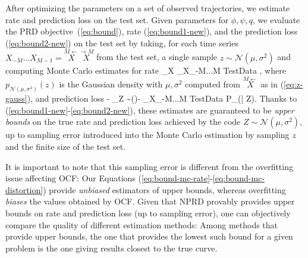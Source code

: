\documentclass[entropy,article,submit,moreauthors,pdftex,10pt,a4paper]{Definitions/mdpi}
\newcommand{\finitefuture}{\stackrel{\rightarrow \scriptscriptstyle{M}}{X}}
\newcommand{\finitepast}{\stackrel{\scriptscriptstyle{M}\leftarrow}{X}}%
\let\oldequation\equation
\let\oldendequation\endequation
\renewenvironment{equation}
  {\linenomathNonumbers\oldequation}
  {\oldendequation\endlinenomath}
\begin{document}
After optimizing the parameters on a set of observed trajectories, we estimate rate and prediction loss on the test set.
Given parameters for $\phi, \psi, q$, we evaluate the PRD objective~(\ref{eq:bound}), rate (\ref{eq:bound1-new}), and the prediction loss (\ref{eq:bound2-new}) on the test set by taking, for each time series $X_{-M}...X_{M-1} = \finitepast\finitefuture$ from the test set, a single sample $z  \sim \mathcal{N}(\mu, \sigma^2)$ and computing Monte Carlo estimates for rate
\begin{equation}\label{eq:bound-mc-rate}
_{X}\left[ \operatorname{D_{KL}}\infdivx{P_\phi(Z|\finitepast)}{q(Z)}\right] \approx	{}	\sum_{X_{-M...M} \in TestData}  \log {},
\end{equation}
where $p_{\mathcal{N}(\mu, \sigma^2)}(z)$ is the Gaussian density with $\mu, \sigma^2$ computed from $\finitepast$ as in (\ref{eq:z-gauss}), and prediction loss 
\begin{equation}\label{eq:bound-mc-distortion}
 -	_{Z \sim \phi(\finitepast)}\left[\log P_\psi(\finitefuture | Z)\right] \approx - 	\sum_{X_{-M...M} \in TestData}	\log P_\psi(\finitefuture | Z).
\end{equation}
Thanks to (\ref{eq:bound1-new}-\ref{eq:bound2-new}), these estimates are guaranteed to be \emph{upper bounds} on the true rate and prediction loss achieved by the code $Z  \sim \mathcal{N}(\mu, \sigma^2)$, up to sampling error introduced into the Monte Carlo estimation by sampling $z$ and the finite size of the test set.



It is important to note that this sampling error is different from the overfitting issue affecting OCF: 
Our Equations (\ref{eq:bound-mc-rate}-\ref{eq:bound-mc-distortion}) provide \emph{unbiased} estimators of upper bounds, whereas overfitting \emph{biases} the values obtained by OCF.
Given that NPRD provably provides upper bounds on rate and prediction loss (up to sampling error), one can objectively compare the quality of different estimation methods:
Among methods that provide upper bounds, the one that provides the lowest such bound for a given problem is the one giving results closest to the true curve.
\end{document}
